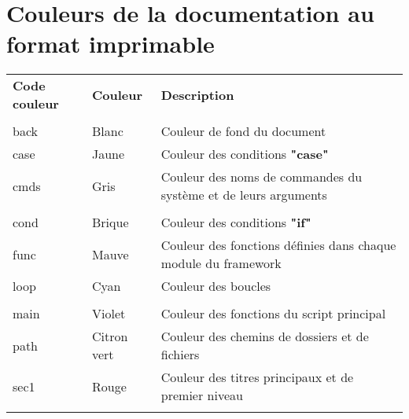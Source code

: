 \documentclass[a4paper,10pt]{article}
\begin{document}
    \newpage





    \color{red}
    \section{Couleurs de la documentation au format imprimable}\color{text}

    \begin{justify}
        \begin{tabular}{lll}
            \textbf{Code couleur} & \textbf{Couleur}    & \textbf{Description}\\\\

            \color{text}back  & \color{text}Blanc       & \color{text}Couleur de fond du document\\
            \color{case}case  & \color{case}Jaune       & \color{case}Couleur des conditions \textbf{"case"}\\
            \color{cmds}cmds  & \color{cmds}Gris        & \color{cmds}Couleur des noms de commandes du système et de leurs arguments\\\\

            \color{cond}cond  & \color{cond}Brique      & \color{cond}Couleur des conditions \textbf{"if"}\\
            \color{func}func  & \color{func}Mauve       & \color{func}Couleur des fonctions définies dans chaque module du framework\\
            \color{loop}loop  & \color{loop}Cyan        & \color{loop}Couleur des boucles\\\\

            \color{main}main  & \color{main}Violet      & \color{main}Couleur des fonctions du script principal\\
            \color{path}path  & \color{path}Citron vert & \color{path}Couleur des chemins de dossiers et de fichiers\\
            \color{sec1}sec1  & \color{sec1}Rouge       & \color{sec1}Couleur des titres principaux et de premier niveau\\\\


\end{tabular}
\end{justify}
\end{document}
